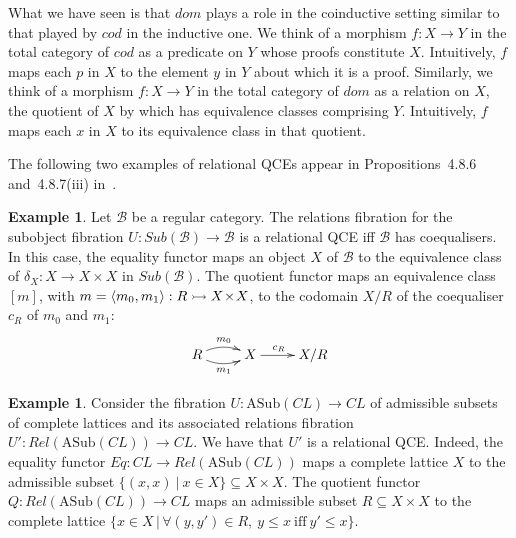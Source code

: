 \documentclass{LMCS}
\newcommand{\ra}{\rightarrow}
\newcommand\B{{\mathcal B}}
\newcommand\ascl{\mathrm{ASub}(\cl)}
\newcommand\cl{\mathit{CL}}
\newcommand\ti{\!\times\!}
\theoremstyle{plain}
\theoremstyle{remark}
\theoremstyle{definition}
\newtheorem{example}[theorem]{Example}
\begin{document}
What we have seen is that $\mathit{dom}$ plays a role in the
coinductive setting similar to that played by $\mathit{cod}$ in the
inductive one. We think of a morphism $f:X \ra Y$ in the total
category of $\mathit{cod}$ as a predicate on $Y$ whose proofs
constitute $X$. Intuitively, $f$ maps each $p$ in $X$ to the element
$y$ in $Y$ about which it is a proof. Similarly, we think of a
morphism $f:X \ra Y$ in the total category of $\mathit{dom}$ as a
relation on $X$, the quotient of $X$ by which has equivalence classes
comprising $Y$. Intuitively, $f$ maps each $x$ in $X$ to its
equivalence class in that quotient.

The following two examples of relational QCEs appear in
Propositions~4.8.6 and~4.8.7(iii) in~\cite{jac99}.

\begin{example}
  Let $\B$ be a regular category. The relations fibration for the
  subobject fibration $U:Sub(\B)\to\B$ is a relational QCE iff $\B$
  has coequalisers. In this case, the equality functor maps an object
  $X$ of $\B$ to the equivalence class of $\delta_X:X\to X\ti X$ in
  $Sub(\B)$. The quotient functor maps an equivalence class $[m]$,
  with $m = \langle m_0,m_1 \rangle :R\mto X\ti X$, to the codomain
  $X/R$ of the coequaliser $c_R$ of $m_0$ and $m_1$:
  \[\xymatrix{R\ar@/^/[r]^{m_0}\ar@/_/[r]_{m_1} & X
      \ar[r]^{\!\!\!c_R} & X/R}\]
  \end{example}
  
  \begin{example}
    Consider the fibration $U:\ascl\to\cl$ of admissible subsets of
    complete lattices and its associated relations fibration
    $U':Rel(\ascl)\to\cl$.  We have that $U'$ is a relational
    QCE. Indeed, the equality functor $Eq:\cl\to Rel(\ascl)$ maps a
    complete lattice $X$ to the admissible subset $\{ (x,x)\ |\ x\in
      X\} \subseteq X\ti X$.  The quotient functor
      $Q:Rel(\ascl)\to\cl$ maps an admissible subset $R \subseteq X\ti
      X$ to the complete lattice $\{x\in X\,|\,\forall (y,y')\in
      R,\ y\leq x\ \text{iff}\ y'\leq x\}$.
  \end{example}
\end{document}
